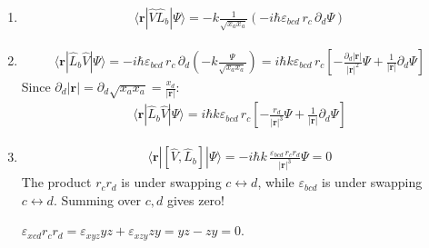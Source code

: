 \documentclass[letterpaper,10pt,english]{jupyterBook}
\begin{document}
\begin{enumerate}
%
\item {} 
\sphinxAtStartPar
{}
\begin{equation*}
\begin{split}\langle \mathbf{r} | \hat{V} \hat{L}_b | \Psi \rangle = -k \frac{1}{\sqrt{x_a x_a}} \left( -i\hbar \varepsilon_{bcd} \, r_c \, \partial_d \Psi \right)\end{split}
\end{equation*}
\item {} 
\sphinxAtStartPar
{}
\begin{equation*}
\begin{split}\langle \mathbf{r} | \hat{L}_b \hat{V} | \Psi \rangle = -i\hbar \varepsilon_{bcd} \, r_c \, \partial_d \left( -k \frac{\Psi}{\sqrt{x_a x_a}} \right) = i\hbar k \varepsilon_{bcd} \, r_c \left[ -\frac{\partial_d |\mathbf{r}|}{|\mathbf{r}|^2} \Psi + \frac{1}{|\mathbf{r}|} \partial_d \Psi \right]\end{split}
\end{equation*}
\sphinxAtStartPar
Since \(\partial_d | \mathbf{r}| = \partial_d \sqrt{x_a x_a} = \frac{x_d}{|\mathbf{r}|}\):
\begin{equation*}
\begin{split}\langle \mathbf{r} | \hat{L}_b \hat{V} | \Psi \rangle = i\hbar k \varepsilon_{bcd} \, r_c \left[ -\frac{r_d}{|\mathbf{r}|^3} \Psi + \frac{1}{|\mathbf{r}|} \partial_d \Psi \right]\end{split}
\end{equation*}
\item {} 
\sphinxAtStartPar
{}
\begin{equation*}
\begin{split}\langle \mathbf{r} | [\hat{V}, \hat{L}_b] | \Psi \rangle = -i\hbar k \, \frac{\varepsilon_{bcd} \, r_c r_d}{|\mathbf{r}|^3} \Psi = 0\end{split}
\end{equation*}
\sphinxAtStartPar
{} The product \(r_c r_d\) is  under swapping \(c \leftrightarrow d\), while \(\varepsilon_{bcd}\) is  under swapping \(c \leftrightarrow d\). Summing over \(c, d\) gives zero!

\sphinxAtStartPar
{} \(\varepsilon_{xcd} r_c r_d = \varepsilon_{xyz} y z + \varepsilon_{xzy} z y = yz - zy = 0\).

\end{enumerate}
\end{document}
